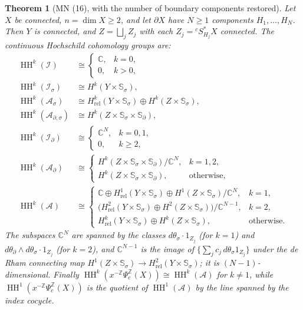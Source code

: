 \documentclass[11pt,oneside,reqno]{article}
\DeclareMathOperator{\HH}{HH}
\newcommand{\C}{\mathbb C}
\newcommand{\Z}{\mathbb Z}
\newcommand{\cA}{\mathcal A}
\newcommand{\cI}{\mathcal I}
\newcommand{\Is}{\mathcal I_\sigma}
\newcommand{\Id}{\mathcal I_\partial}
\newcommand{\As}{\mathcal A_\sigma}
\newcommand{\Ad}{\mathcal A_\partial}
\newcommand{\Ads}{\mathcal A_{\partial,\sigma}}
\newcommand{\Psic}{\Psi_{c}}
\newcommand{\Ssig}{\mathbb S_\sigma}
\newcommand{\Sd}{\mathbb S_\partial}
\newcommand{\Hrel}{H_{\mathrm{rel}}}
\theoremstyle{plain}
\newtheorem{theorem}{Theorem}[section]
\theoremstyle{definition}
\theoremstyle{remark}
\begin{document}
\begin{theorem}[MN (16), with the number of boundary components restored]
\label{thm:main}
Let \(X\) be connected, \(n=\dim X\ge2\), and let \(\partial X\) have
\(N\ge1\) components \(H_1,\dots,H_N\). Then \(Y\) is connected, and
\(Z=\bigsqcup_jZ_j\) with each \(Z_j={}^cS^*_{H_j}X\) connected. The
continuous Hochschild cohomology groups are:
\begin{align*}
 \HH^k(\cI)&\cong\begin{cases}\C,&k=0,\\0,&k>0,\end{cases}\\
 \HH^k(\Is)&\cong H^k(Y\times\Ssig),\\
 \HH^k(\As)&\cong\Hrel^k(Y\times\Ssig)\oplus H^k(Z\times\Ssig),\\
 \HH^k(\Ads)&\cong H^k(Z\times\Ssig\times\Sd),\\
 \HH^k(\Id)&\cong\begin{cases}\C^N,&k=0,1,\\0,&k\ge2,\end{cases}\\
 \HH^k(\Ad)&\cong\begin{cases}H^k(Z\times\Ssig\times\Sd)/\C^N,&k=1,2,\\
 H^k(Z\times\Ssig\times\Sd),&\text{otherwise,}\end{cases}\\
 \HH^k(\cA)&\cong\begin{cases}
 \C\oplus\Hrel^1(Y\times\Ssig)\oplus H^1(Z\times\Ssig)/\C^N,&k=1,\\
 \bigl(\Hrel^2(Y\times\Ssig)\oplus H^2(Z\times\Ssig)\bigr)/\C^{N-1},&k=2,\\
 \Hrel^k(Y\times\Ssig)\oplus H^k(Z\times\Ssig),&\text{otherwise.}
 \end{cases}
\end{align*}
The subspaces \(\C^N\) are spanned by the classes \(d\theta_\sigma\cdot
1_{Z_j}\) (for \(k=1\)) and \(d\theta_\partial\wedge d\theta_\sigma\cdot
1_{Z_j}\) (for \(k=2\)), and \(\C^{N-1}\) is the image of
\(\{\sum_jc_j\,d\theta_\sigma1_{Z_j}\}\) under the de Rham connecting map
\(H^1(Z\times\Ssig)\to\Hrel^2(Y\times\Ssig)\); it is
\((N-1)\)-dimensional. Finally \(\HH^k(x^{-\Z}\Psic^{\Z}(X))\cong
\HH^k(\cA)\) for \(k\ne1\), while \(\HH^1(x^{-\Z}\Psic^{\Z}(X))\) is the
quotient of \(\HH^1(\cA)\) by the line spanned by the index cocycle.
\end{theorem}
\end{document}
